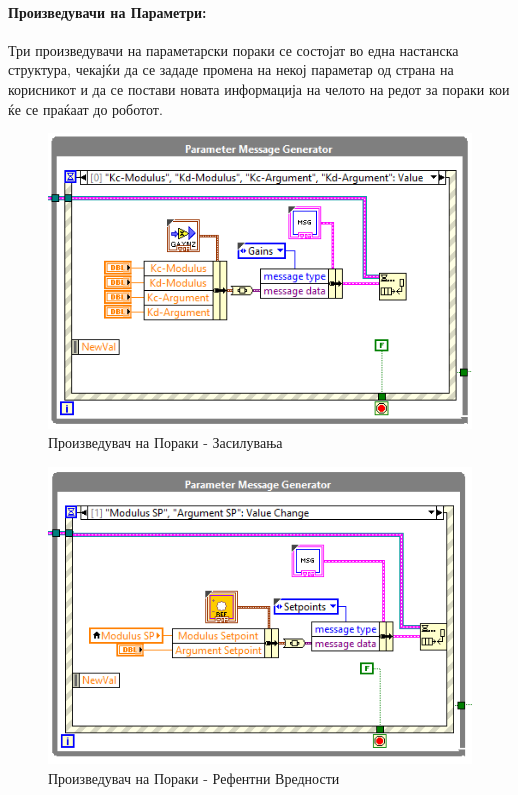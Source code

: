 \documentclass[11pt]{article}
\begin{document}
    \paragraph{Произведувачи на Параметри:\\}
      Три произведувачи на параметарски пораки се состојат во една настанска структура, чекајќи да се зададе промена на некој параметар од страна на корисникот и да се постави новата информација на челото на редот за пораки кои ќе се праќаат до роботот.
      \begin{figure}[H]
          \centering
          \includegraphics[width=0.75\linewidth]{./images/gain_message_generator.png}
          \caption{Произведувач на Пораки - Засилувања}
          \end{figure}
      \begin{figure}[H]
          \centering
          \includegraphics[width=0.75\linewidth]{./images/setpoint_message_generator.png}
          \caption{Произведувач на Пораки - Рефентни Вредности}
          \end{figure}
\end{document}

